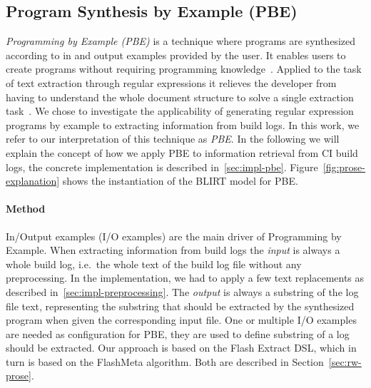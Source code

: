\documentclass[\myrootdir/main.tex]{subfiles}
\begin{document}
\subsection{Program Synthesis by Example (PBE)}
\label{sec:expl-pbe}

\emph{Programming by Example (PBE)} is a technique where programs are synthesized according to in and output examples provided by the user.
It enables users to create programs without requiring programming knowledge~\cite{mayer2015user}.
Applied to the task of text extraction through regular expressions it relieves the developer from having to understand the whole document structure to solve a single extraction task~\cite{le2014flashextract:}.
We chose to investigate the applicability of generating regular expression programs by example to extracting information from build logs.
In this work, we refer to our interpretation of this technique as \emph{PBE}.
In the following we will explain the concept of how we apply PBE to information retrieval from CI build logs, the concrete implementation is described in~\ref{sec:impl-pbe}.
Figure~\ref{fig:prose-explanation} shows the instantiation of the BLIRT model for PBE\@.

\paragraph{Method}
In/Output examples (I/O examples) are the main driver of Programming by Example.
When extracting information from build logs the \emph{input} is always a whole build log, i.e.\ the whole text of the build log file without any preprocessing.
In the implementation, we had to apply a few text replacements as described in~\ref{sec:impl-preprocessing}.
The \emph{output} is always a substring of the log file text, representing the substring that should be extracted by the synthesized program when given the corresponding input file.
One or multiple I/O examples are needed as configuration for PBE, they are used to define substring of a log should be extracted.
Our approach is based on the Flash Extract DSL, which in turn is based on the FlashMeta algorithm.
Both are described in Section~\ref{sec:rw-prose}.

\end{document}
